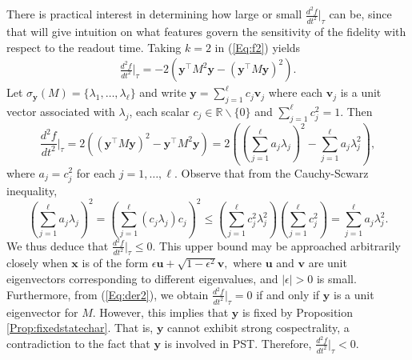 \documentclass[11pt]{article}
\newcommand{\bv}{\mathbf v}
\newcommand{\bx}{\mathbf x}
\newcommand{\by}{\mathbf y}
\newcommand{\bu}{\mathbf u}
\def\R{\mathbb{R}}
\begin{document}
There is practical interest in determining how large or small  $ \frac{d^2f}{dt^2}\Big|_{\tau}$ can be, since that will give intuition on what features govern the sensitivity of the fidelity with respect to the readout time. Taking $k=2$ in (\ref{Eq:f2}) yields 
\begin{equation}
\label{Eq:der2} 
\begin{split}
\frac{d^2f}{dt^2}\Big|_{\tau}=-2(\by^\top M^2 \by - (\by^\top M \by)^2).
\end{split}
\end{equation}
Let $\sigma_{\by}(M)=\{\lambda_1, \ldots, \lambda_\ell\}$ and write $\by=\sum_{j=1}^\ell c_j\bv_j$ where each $\bv_j$ is a unit vector associated with $\lambda_j$, each scalar $c_j\in\R\backslash\{0\}$ and $\sum_{j=1}^\ell c_j^2=1$. Then
\begin{equation*}
\frac{d^2f}{dt^2}\Big|_{\tau} = 2((\by^\top M \by)^2 -\by^\top M^2 \by  ) = 2\left(\left(\sum_{j=1}^\ell a_j \lambda_j\right)^2 - \sum_{j=1}^\ell a_j \lambda_j^2 \right),
\end{equation*}
where $a_j=c_j^2$ for each $j=1, \ldots, \ell.$ Observe that from the Cauchy-Scwarz inequality,
\begin{equation*}
\left(\sum_{j=1}^\ell a_j \lambda_j\right)^2 = \left(\sum_{j=1}^\ell (c_j \lambda_j) c_j\right)^2 \le \left(\sum_{j=1}^\ell c_j^2 \lambda_j^2\right) \left(\sum_{j=1}^\ell c_j^2\right) = \sum_{j=1}^\ell a_j \lambda_j^2.
\end{equation*}
We thus deduce that $\frac{d^2f}{dt^2}\Big|_{\tau} \le 0.$ This upper bound may be approached arbitrarily closely when 
$\bx$ is of the form $\epsilon\bu + \sqrt{1-\epsilon^2} \bv,$ where $\bu$ and $\bv$ 
are unit  eigenvectors corresponding to different eigenvalues, and $|\epsilon|>0$ is small. Furthermore, from (\ref{Eq:der2}), we obtain $\frac{d^2f}{dt^2}\Big|_{\tau}=0$ if and only if $\by$ is a unit eigenvector for $M$. However, this implies that $\by$ is fixed by Proposition \ref{Prop:fixedstatechar}. That is, $\by$ cannot exhibit strong cospectrality, a contradiction to the fact that $\by$ is involved in PST. Therefore, $\frac{d^2f}{dt^2}\Big|_{\tau}<0$.
\end{document}

